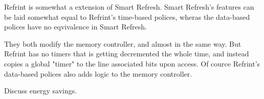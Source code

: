 Refrint is somewhat a extension of Smart Refresh. Smart Refresh's features can be laid somewhat equal to Refrint's time-based polices, wheras the data-based polices have no eqvivalence in Smart Refresh.

They both modify the memory controller, and almost in the same way. But Refrint has no timers that is getting decremented the whole time, and instead copies a global "timer" to the line associated bits upon access. Of cource Refrint's data-based polices also adds logic to the memory controller.

Discuss energy savings.

